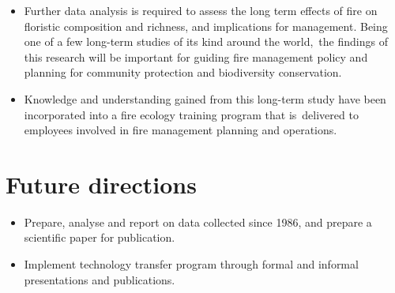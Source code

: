 \documentclass[version=last,
    paper=a4,                               %
    10pt,                                   %
    dvipsnames,
    oneside,                              %
    headings=openany,                       %
    open=any,
    BCOR=7mm,                               %
    DIV=15,     %
]{scrbook}
\begin{document}
\begin{itemize}
\itemsep1pt\parskip0pt
\item
  Further data analysis is required to assess the long term effects of
  fire on floristic composition and richness, and implications for
  management. Being one of a few long-term studies of its kind around
  the world,~the findings of this research will be important for guiding
  fire management policy and planning for community protection and
  biodiversity conservation.
\item
  Knowledge and understanding gained from this long-term study have been
  incorporated into a fire ecology training program that is~delivered to
  employees involved in fire management planning and operations.~
\end{itemize}




\section*{Future directions}

\begin{itemize}
\itemsep1pt\parskip0pt
\item
  Prepare, analyse and report on data collected since 1986, and prepare
  a scientific paper for publication.
\item
  Implement technology transfer program through formal and informal
  presentations and publications.
\end{itemize}



\end{document}
